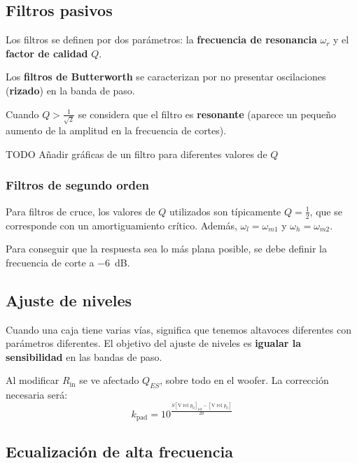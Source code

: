 \documentclass[12pt, a4paper]{article}
\begin{document}
\subsection{Filtros pasivos}

Los filtros se definen por dos parámetros: la \textbf{frecuencia de resonancia} $\omega _r$ y el \textbf{factor de calidad} $Q$.

Los \textbf{filtros de Butterworth} se caracterizan por no presentar oscilaciones (\textbf{rizado}) en la banda de paso.

Cuando $Q>\frac{1}{\sqrt{2}}$ se considera que el filtro es \textbf{resonante} (aparece un pequeño aumento de la amplitud en la frecuencia de cortes).

TODO Añadir gráficas de un filtro para diferentes valores de $Q$


\subsubsection{Filtros de segundo orden}

Para filtros de cruce, los valores de $Q$ utilizados son típicamente $Q=\frac{1}{2}$, que se corresponde con un amortiguamiento crítico. Además, $\omega_l = \omega_{m1}$ y $\omega_h = \omega_{m2}$.

Para conseguir que la respuesta sea lo más plana posible, se debe definir la frecuencia de corte a \qty{-6}{\dB}.

\subsection{Ajuste de niveles}

Cuando una caja tiene varias vías, significa que tenemos altavoces diferentes con parámetros diferentes. El objetivo del ajuste de niveles es \textbf{igualar la sensibilidad} en las bandas de paso.

Al modificar $R _{\text{in}}$ se ve afectado $Q_{ES}$, sobre todo en el woofer. La corrección necesaria será:
\begin{equation} \label{eq:correccion_niveles}
  k _{\text{pad}} = 10^{\frac{S \left[ \unit{\volt} \text{ rel } p_0\right] _{\text{ref}} - \left[ \unit{\volt} \text{ rel } p_0 \right] }{20}}
\end{equation}

\subsection{Ecualización de alta frecuencia}
\end{document}
